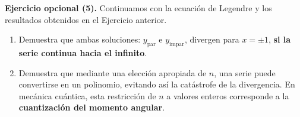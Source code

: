 \textbf{Ejercicio opcional (5).} Continuamos con la ecuación de Legendre y los resultados obtenidos en el Ejercicio anterior.

\begin{enumerate}[resume]
\item Demuestra que ambas soluciones: $y_{\mbox{par}}$ e $y_{\mbox{impar}}$, divergen para $x = \pm 1$, \textbf{si la serie continua hacia el infinito}.
\item Demuestra que mediante una elección apropiada de $n$, una serie puede convertirse en un polinomio, evitando así la catástrofe de la divergencia. En mecánica cuántica, esta restricción de $n$ a valores enteros corresponde a la \textbf{cuantización del momento angular}.
\end{enumerate}

